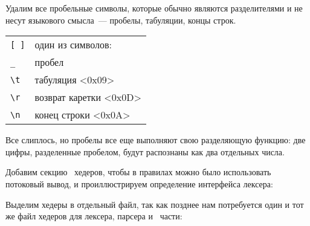 Удалим все пробельные символы, которые обычно
являются разделителями и не несут языкового смысла\ --- пробелы, табуляции,
концы строк.
\begin{tabular}{l l}
\verb|[ ]| & один из символов: \\
\verb|_| & пробел \\
\verb|\t| & табуляция <0x09> \\
\verb|\r| & возврат каретки <0x0D> \\
\verb|\n| & конец строки <0x0A> \\
\end{tabular}

Все слиплось, но пробелы все еще выполняют свою разделяющую функцию: две цифры,
разделенные пробелом, будут распознаны как два отдельных числа.

\bigskip
Добавим секцию \cpp\ хедеров, чтобы в правилах можно было использовать потоковый
вывод, и проиллюстрируем определение интерфейса лексера:


Выделим хедеры в отдельный файл, так как позднее нам потребуется один и тот же
файл хедеров для лексера, парсера и \cpp\  части:

